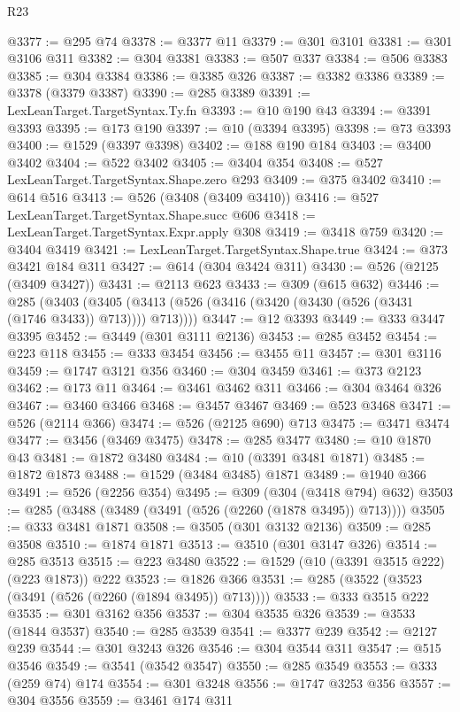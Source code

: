 \begin{lexlean}{R23}
\begin{coremodule}
@3377 := @295 @74
@3378 := @3377 @11
@3379 := @301 @3101
@3381 := @301 @3106 @311
@3382 := @304 @3381
@3383 := @507 @337
@3384 := @506 @3383
@3385 := @304 @3384
@3386 := @3385 @326
@3387 := @3382 @3386
@3389 := @3378 (@3379 @3387)
@3390 := @285 @3389
@3391 := LexLeanTarget.TargetSyntax.Ty.fn
@3393 := @10 @190 @43
@3394 := @3391 @3393
@3395 := @173 @190
@3397 := @10 (@3394 @3395)
@3398 := @73 @3393
@3400 := @1529 (@3397 @3398)
@3402 := @188 @190 @184
@3403 := @3400 @3402
@3404 := @522 @3402
@3405 := @3404 @354
@3408 := @527 LexLeanTarget.TargetSyntax.Shape.zero @293
@3409 := @375 @3402
@3410 := @614 @516
@3413 := @526 (@3408 (@3409 @3410))
@3416 := @527 LexLeanTarget.TargetSyntax.Shape.succ @606
@3418 := LexLeanTarget.TargetSyntax.Expr.apply @308
@3419 := @3418 @759
@3420 := @3404 @3419
@3421 := LexLeanTarget.TargetSyntax.Shape.true
@3424 := @373 @3421 @184 @311
@3427 := @614 (@304 @3424 @311)
@3430 := @526 (@2125 (@3409 @3427))
@3431 := @2113 @623
@3433 := @309 (@615 @632)
@3446 := @285
    (@3403 (@3405 (@3413 (@526 (@3416 (@3420 (@3430 (@526 (@3431 (@1746 @3433)) @713)))) @713))))
@3447 := @12 @3393
@3449 := @333 @3447 @3395
@3452 := @3449 (@301 @3111 @2136)
@3453 := @285 @3452
@3454 := @223 @118
@3455 := @333 @3454
@3456 := @3455 @11
@3457 := @301 @3116
@3459 := @1747 @3121 @356
@3460 := @304 @3459
@3461 := @373 @2123
@3462 := @173 @11
@3464 := @3461 @3462 @311
@3466 := @304 @3464 @326
@3467 := @3460 @3466
@3468 := @3457 @3467
@3469 := @523 @3468
@3471 := @526 (@2114 @366)
@3474 := @526 (@2125 @690) @713
@3475 := @3471 @3474
@3477 := @3456 (@3469 @3475)
@3478 := @285 @3477
@3480 := @10 @1870 @43
@3481 := @1872 @3480
@3484 := @10 (@3391 @3481 @1871)
@3485 := @1872 @1873
@3488 := @1529 (@3484 @3485) @1871
@3489 := @1940 @366
@3491 := @526 (@2256 @354)
@3495 := @309 (@304 (@3418 @794) @632)
@3503 := @285 (@3488 (@3489 (@3491 (@526 (@2260 (@1878 @3495)) @713))))
@3505 := @333 @3481 @1871
@3508 := @3505 (@301 @3132 @2136)
@3509 := @285 @3508
@3510 := @1874 @1871
@3513 := @3510 (@301 @3147 @326)
@3514 := @285 @3513
@3515 := @223 @3480
@3522 := @1529 (@10 (@3391 @3515 @222) (@223 @1873)) @222
@3523 := @1826 @366
@3531 := @285 (@3522 (@3523 (@3491 (@526 (@2260 (@1894 @3495)) @713))))
@3533 := @333 @3515 @222
@3535 := @301 @3162 @356
@3537 := @304 @3535 @326
@3539 := @3533 (@1844 @3537)
@3540 := @285 @3539
@3541 := @3377 @239
@3542 := @2127 @239
@3544 := @301 @3243 @326
@3546 := @304 @3544 @311
@3547 := @515 @3546
@3549 := @3541 (@3542 @3547)
@3550 := @285 @3549
@3553 := @333 (@259 @74) @174
@3554 := @301 @3248
@3556 := @1747 @3253 @356
@3557 := @304 @3556
@3559 := @3461 @174 @311

\end{coremodule}
\end{lexlean}
